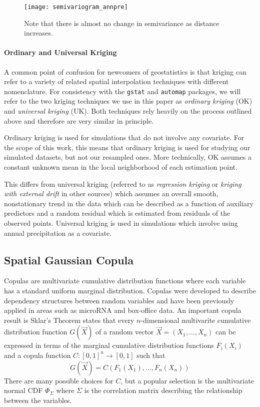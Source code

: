 \documentclass{article}
\begin{document}
\begin{wrapfigure}{hr}{.4\textwidth}
	\texttt{[image: semivariogram\_annpre]}
	\caption{\label{fig:annpre}Note that there is almost no change in semivariance as distance increases.}
\end{wrapfigure}

\paragraph{Ordinary and Universal Kriging} A common point of confusion for newcomers of geostatistics is that kriging can refer to a variety of related spatial interpolation techniques with different nomenclature.
For consistency with the \texttt{gstat} and \texttt{automap} packages, we will refer to the two kriging techniques we use in this paper as \textit{ordinary kriging} (OK) and \textit{universal kriging} (UK).
Both techniques rely heavily on the process outlined above and therefore are very similar in principle.

Ordinary kriging is used for simulations that do not involve any covariate.
For the scope of this work, this means that ordinary kriging is used for studying our simulated datasets, but not our resampled ones.
More technically, OK assumes a constant unknown mean in the local neighborhood of each estimation point.

This differs from universal kriging (referred to as \textit{regression kriging} or \textit{kriging with external drift} in other sources) which assumes an overall smooth, nonstationary trend in the data which can be described as a function of auxiliary predictors and a random residual which is estimated from residuals of the observed points.\cite{kis15}
Universal kriging is used in simulations which involve using annual precipitation as a covariate.

\subsection{Spatial Gaussian Copula}
Copulas are multivariate cumulative distribution functions where each variable has a standard uniform marginal distribution.
Copulas were developed to describe dependency structures between random variables and have been previously applied in areas such as microRNA\cite{gaynanova18} and box-office data\cite{duan17}.
An important copula result is Sklar's Theorem states that every $n$-dimensional multivarite cumulative distribution function $G(\vec{X})$ of a random vector $\vec{X} = (X_1, \ldots ,X_n)$ can be expressed in terms of the marginal cumulative distribution functions $F_i(X_i)$ and a copula function $C: [0,1]^n \rightarrow [0,1]$ such that
$$
G(\vec{X}) = C(F_1(X_1), \ldots, F_n(X_n))
$$
There are many possible choices for $C$, but a popular selection is the multivariate normal CDF $\Phi_{\Sigma}$ where $\Sigma$ is the correlation matrix describing the relationship between the variables.
\end{document}
